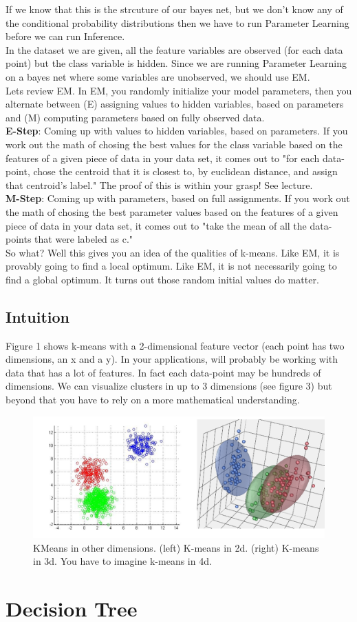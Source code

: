 \documentclass[10pt,letterpaper]{article}
\begin{document}
If we know that this is the strcuture of our bayes net, but we don't know any of the conditional probability distributions then we have to run Parameter Learning before we can run Inference.\\


In the dataset we are given, all the feature variables are observed (for each data point) but the class variable is hidden. Since we are running Parameter Learning on a bayes net where some variables are unobserved, we should use EM.\\


Lets review EM. In EM, you randomly initialize your model parameters, then you alternate between (E) assigning values to hidden variables, based on parameters and (M) computing parameters based on fully observed data.\\


\textbf{E-Step}: Coming up with values to hidden variables, based on parameters. If you work out the math of chosing the best values for the class variable based on the features of a given piece of data in your data set, it comes out to "for each data-point, chose the centroid that it is closest to, by euclidean distance, and assign that centroid's label." The proof of this is within your grasp! See lecture.\\


\textbf{M-Step}: Coming up with parameters, based on full assignments. If you work out the math of chosing the best parameter values based on the features of a given piece of data in your data set, it comes out to "take the mean of all the data-points that were labeled as c."\\


So what? Well this gives you an idea of the qualities of k-means. Like EM, it is provably going to find a local optimum. Like EM, it is not necessarily going to find a global optimum. It turns out those random initial values do matter.\\

\subsection{Intuition}

Figure 1 shows k-means with a 2-dimensional feature vector (each point has two dimensions, an x and a y). In your applications, will probably be working with data that has a lot of features. In fact each data-point may be hundreds of dimensions. We can visualize clusters in up to 3 dimensions (see figure 3) but beyond that you have to rely on a more mathematical understanding.\\

\begin{figure}[H]
\includegraphics[width=.6\textwidth]{kmeans3d.png}
\centering
\caption{KMeans in other dimensions. (left) K-means in 2d. (right) K-means in 3d. You have to imagine k-means in 4d.}
\label{figure3}
\end{figure}


\section{Decision Tree}
\end{document}
